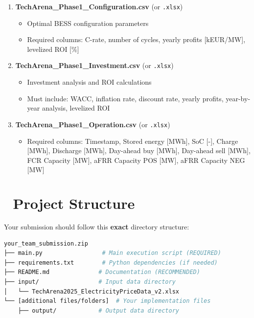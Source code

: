 \documentclass[11pt,a4paper]{article}
\begin{document}
\begin{enumerate}
    \item \textbf{TechArena\_Phase1\_Configuration.csv} (or \texttt{.xlsx})
    \begin{itemize}[leftmargin=*]
        \item Optimal BESS configuration parameters
        \item Required columns: C-rate, number of cycles, yearly profits [kEUR/MW], levelized ROI [\%]
    \end{itemize}
    
    \item \textbf{TechArena\_Phase1\_Investment.csv} (or \texttt{.xlsx})
    \begin{itemize}[leftmargin=*]
        \item Investment analysis and ROI calculations
        \item Must include: WACC, inflation rate, discount rate, yearly profits, year-by-year analysis, levelized ROI
    \end{itemize}
    
    \item \textbf{TechArena\_Phase1\_Operation.csv} (or \texttt{.xlsx})
    \begin{itemize}[leftmargin=*]
        \item Required columns: Timestamp, Stored energy [MWh], SoC [-], Charge [MWh], Discharge [MWh], Day-ahead buy [MWh], Day-ahead sell [MWh], FCR Capacity [MW], aFRR Capacity POS [MW], aFRR Capacity NEG [MW]
    \end{itemize}
\end{enumerate}

\section*{📁 Project Structure}

Your submission should follow this \textbf{exact} directory structure:

\begin{lstlisting}[language=bash, caption=Required Directory Structure]
your_team_submission.zip
├── main.py                 # Main execution script (REQUIRED)
├── requirements.txt        # Python dependencies (if needed)
├── README.md              # Documentation (RECOMMENDED)
├── input/                 # Input data directory
│   └── TechArena2025_ElectricityPriceData_v2.xlsx
└── [additional files/folders]  # Your implementation files
    ├── output/            # Output data directory
\end{lstlisting}
\end{document}
